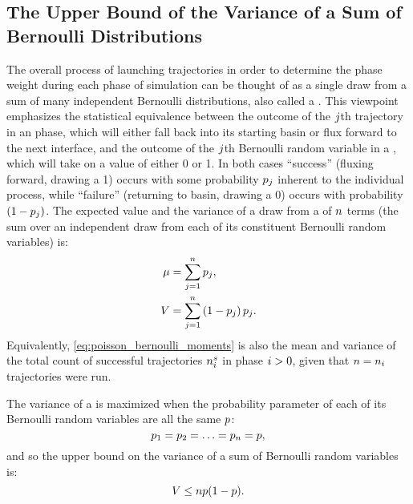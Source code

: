 %
%
%
%

\subsection{The Upper Bound of the Variance of a Sum of Bernoulli Distributions}
\label{sec:bernoulli_mixture_var}
The overall process of launching trajectories in order to determine the phase weight during each phase of  simulation can be thought of as a single draw from a sum of many independent Bernoulli distributions, also called a . This viewpoint emphasizes the statistical equivalence between the outcome of the $j$th trajectory in an  phase, which will either fall back into its starting basin or flux forward to the next interface, and the outcome of the $j$th Bernoulli random variable in a , which will take on a value of either 0 or 1. In both cases ``success'' (fluxing forward, drawing a 1) occurs with some probability $p_{j}$ inherent to the individual process, while ``failure'' (returning to basin, drawing a 0) occurs with probability $(1 - p_{j})$. The expected value and the variance of a draw from a  of $n$ terms (\ie the sum over an independent draw from each of its constituent Bernoulli random variables) is:
    \begin{align}
    \label{eq:poisson_bernoulli_moments}
        \begin{split}
            \mu &= \sum _{j=1}^{n} p_{j}, \\
            V &= \sum _{j=1}^{n} \left( 1 - p_{j} \right) p_{j}.
        \end{split}
    \end{align}
Equivalently, \eqref{eq:poisson_bernoulli_moments} is also the mean and variance of the total count of successful trajectories $n_{i}^{s}$ in  phase $i>0$, given that $n = n_{i}$ trajectories were run.

The variance of a  is maximized when the probability parameter of each of its Bernoulli random variables are all the same $p$:
    \begin{equation*}
        p_{1} = p_{2} = \ldots = p_{n} = p,
    \end{equation*}
and so the upper bound on the variance of a sum of Bernoulli random variables is:
    \begin{equation}
    \label{eq:bernoulli_mixture_variance_max}
        V \leq n p(1 - p).
    \end{equation}

